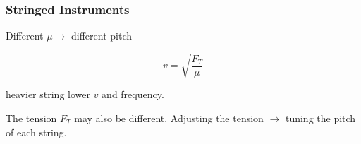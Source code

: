\documentclass[]{beamer}
\begin{document}
\begin{frame}
\frametitle{Stringed Instruments}


 Different $\mu\rightarrow$ different pitch

\pause


\begin{equation}
v=\sqrt{\frac{F_T}{\mu}}
\end{equation}

\vspace{3mm}
\pause

 heavier string \pause  lower $v$ and  frequency. 


\vspace{3mm}
\pause

The tension $F_T$ may also be different.  Adjusting the tension $\rightarrow$ tuning the pitch of each string.


  \end{frame}





















\end{document}
